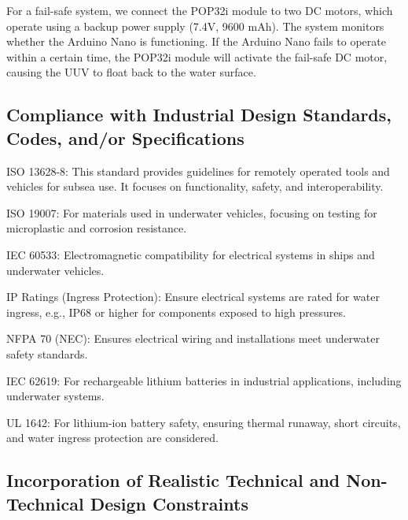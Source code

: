 For a fail-safe system, we connect the POP32i module to two 
DC motors, which operate using a backup power supply 
(7.4V, 9600 mAh). The system monitors whether the Arduino Nano 
is functioning. If the Arduino Nano fails to operate within a 
certain time, the POP32i module will activate the fail-safe 
DC motor, causing the UUV to float back to the water surface.

\subsection{Compliance with Industrial Design Standards, Codes, and/or Specifications}

ISO 13628-8: This standard provides guidelines for remotely operated tools and vehicles for subsea use. It focuses on functionality, safety, and interoperability. 

ISO 19007: For materials used in underwater vehicles, focusing on testing for microplastic and corrosion resistance. 

IEC 60533: Electromagnetic compatibility for electrical systems in ships and underwater vehicles. 

IP Ratings (Ingress Protection): Ensure electrical systems are rated for water ingress, e.g., IP68 or higher for components exposed to high pressures. 

NFPA 70 (NEC): Ensures electrical wiring and installations meet underwater safety standards. 

IEC 62619: For rechargeable lithium batteries in industrial applications, including underwater systems. 

UL 1642: For lithium-ion battery safety, ensuring thermal runaway, short circuits, and water ingress protection are considered.

\subsection{Incorporation of Realistic Technical and Non-Technical Design Constraints}

